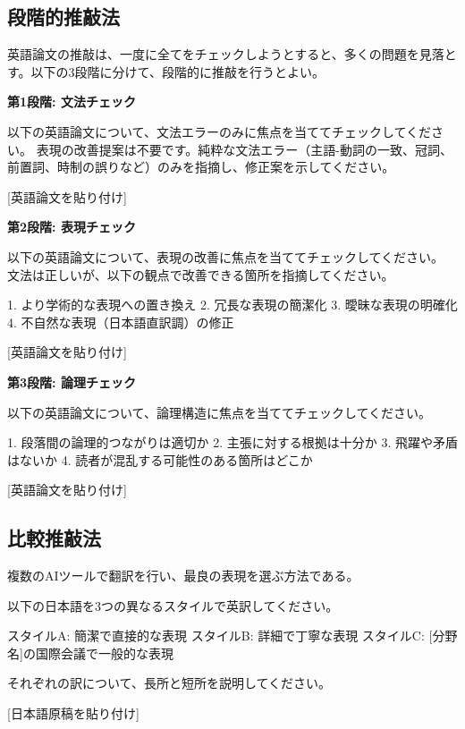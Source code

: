 \subsection{段階的推敲法}

英語論文の推敲は、一度に全てをチェックしようとすると、多くの問題を見落とす。以下の3段階に分けて、段階的に推敲を行うとよい。

\textbf{第1段階: 文法チェック}

\begin{promptbox}
以下の英語論文について、文法エラーのみに焦点を当ててチェックしてください。
表現の改善提案は不要です。純粋な文法エラー（主語-動詞の一致、冠詞、
前置詞、時制の誤りなど）のみを指摘し、修正案を示してください。

{[}英語論文を貼り付け]
\end{promptbox}

\textbf{第2段階: 表現チェック}

\begin{promptbox}
以下の英語論文について、表現の改善に焦点を当ててチェックしてください。
文法は正しいが、以下の観点で改善できる箇所を指摘してください。

1. より学術的な表現への置き換え
2. 冗長な表現の簡潔化
3. 曖昧な表現の明確化
4. 不自然な表現（日本語直訳調）の修正

{[}英語論文を貼り付け]
\end{promptbox}

\textbf{第3段階: 論理チェック}

\begin{promptbox}
以下の英語論文について、論理構造に焦点を当ててチェックしてください。

1. 段落間の論理的つながりは適切か
2. 主張に対する根拠は十分か
3. 飛躍や矛盾はないか
4. 読者が混乱する可能性のある箇所はどこか

{[}英語論文を貼り付け]
\end{promptbox}

\subsection{比較推敲法}

複数のAIツールで翻訳を行い、最良の表現を選ぶ方法である。

\begin{promptbox}
以下の日本語を3つの異なるスタイルで英訳してください。

スタイルA: 簡潔で直接的な表現
スタイルB: 詳細で丁寧な表現
スタイルC: [分野名]の国際会議で一般的な表現

それぞれの訳について、長所と短所を説明してください。

{[}日本語原稿を貼り付け]
\end{promptbox}

